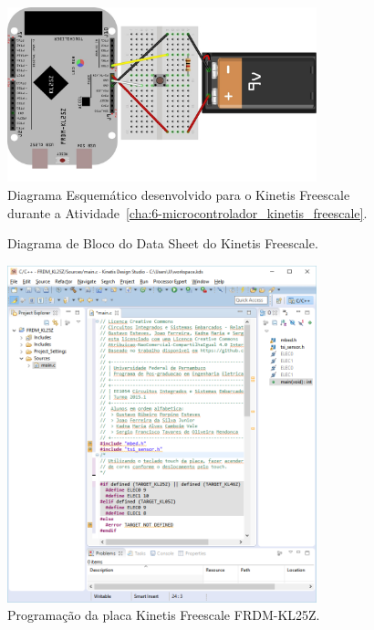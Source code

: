 \documentclass[
	12pt,				%
	openright,			%
  oneside,     %
	a4paper,			%
	english,			%
	french,				%
	spanish,			%
	brazil				%
	]{abntex2}
\begin{document}
\begin{figure}[ht]
  \centering
  \caption{\label{fig:cha:6-05Schematic_bb}Diagrama Esquemático desenvolvido para o Kinetis Freescale durante a Atividade~\ref{cha:6-microcontrolador_kinetis_freescale}.}
  \includegraphics[width=0.8\textwidth]{images/Atividade06/05Schematic_bb.jpg}
\end{figure}

\newpage
\begin{figure}[H]
  \centering
  
  \caption{\label{fig:cha-6-diagrama-bloco-freescale}Diagrama de Bloco do Data Sheet do Kinetis Freescale.}
\end{figure}

\begin{figure}[ht]
  \centering
  \caption{\label{fig:cha:APP_KINETS.png}Programação da placa Kinetis Freescale FRDM-KL25Z.}
  \includegraphics[width=0.8\textwidth]{images/Atividade06/APP_KINETS.png}
\end{figure}
\end{document}
